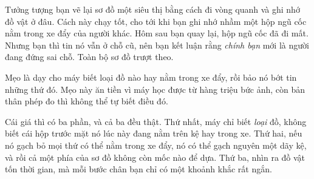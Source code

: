\documentclass[../../deep_learning.tex]{subfiles}
\begin{document}
\begin{dongian}
Tưởng tượng bạn vẽ lại sơ đồ một siêu thị bằng cách đi vòng quanh và ghi nhớ đồ vật ở đâu. Cách này chạy tốt, cho tới khi bạn ghi nhớ nhầm một hộp ngũ cốc nằm trong xe đẩy của người khác. Hôm sau bạn quay lại, hộp ngũ cốc đã đi mất. Nhưng bạn thì tin nó vẫn ở chỗ cũ, nên bạn kết luận rằng \emph{chính bạn} mới là người đang đứng sai chỗ. Toàn bộ sơ đồ trượt theo.

Mẹo là dạy cho máy biết loại đồ nào hay nằm trong xe đẩy, rồi bảo nó bớt tin những thứ đó. Mẹo này ăn tiền vì máy học được từ hàng triệu bức ảnh, còn bản thân phép đo thì không thể tự biết điều đó.

Cái giá thì có ba phần, và cả ba đều thật. Thứ nhất, máy chỉ biết \emph{loại} đồ, không biết cái hộp trước mặt nó lúc này đang nằm trên kệ hay trong xe. Thứ hai, nếu nó gạch bỏ mọi thứ có thể nằm trong xe đẩy, nó có thể gạch nguyên một dãy kệ, và rồi cả một phía của sơ đồ không còn mốc nào để dựa. Thứ ba, nhìn ra đồ vật tốn thời gian, mà mỗi bước chân bạn chỉ có một khoảnh khắc rất ngắn.

\end{dongian}
\end{document}
